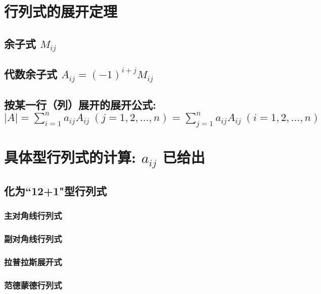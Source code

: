 \documentclass[UTF8]{ctexart}
\begin{document}
	
	\section{行列式的展开定理}
	
	\subsection{余子式 $M_{ij}$}
	
	\subsection{代数余子式 $	A_{ij}=\left( -1 \right) ^{i+j}M_{ij}$}
	
	\subsection{按某一行（列）展开的展开公式: \\ $|A|=\sum_{i=1}^n{a_{ij}A_{ij}\ \left( j=1,2,...,n \right)}=\sum_{j=1}^n{a_{ij}A_{ij}\ \left( i=1,2,...,n \right)}$	}
	
	
	
	\section{具体型行列式的计算: $a_{ij}$ 已给出}
	
	\subsection{化为``12+1"型行列式}
	
		\subsubsection{主对角线行列式}
		
		\subsubsection{副对角线行列式}
		
		\subsubsection{拉普拉斯展开式}
		
		\subsubsection{范德蒙德行列式}
	
\end{document}

